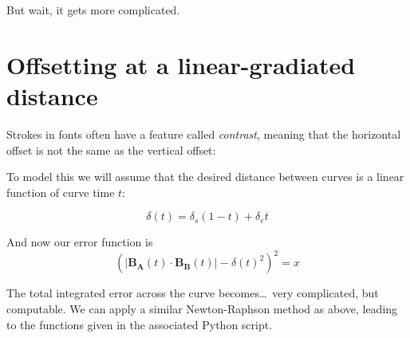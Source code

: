 \documentclass[a4paper]{article}
\newcommand{\norm}[1]{\lvert #1 \rvert}
\begin{document}
But wait, it gets more complicated.

\section{Offsetting at a linear-gradiated distance}

Strokes in fonts often have a feature called \textit{contrast}, meaning that the horizontal offset is not the same as the vertical offset:

\bigskip
{}
\bigskip

To model this we will assume that the desired distance between curves is a linear function of curve time $t$:

\begin{equation}
\delta(t) = \delta_s(1-t) + \delta_e t
\end{equation}

And now our error function is 
\begin{dmath}
(\norm{\mathbf{B_A}(t)\cdot\mathbf{B_B}(t)} - \delta(t)^2)^2 = x
\end{dmath}

The total integrated error across the curve becomes\dots\ very complicated, but computable. We can apply a similar Newton-Raphson method as above, leading to the functions given in the associated Python script.
\end{document}
